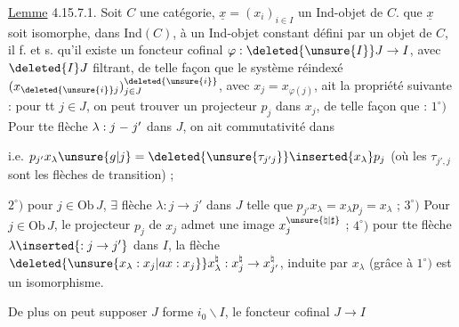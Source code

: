 \uline{Lemme} 4.15.7.1. Soit $C$ une catégorie, $\underline{x}=(x_i)_{i\in I}$ un Ind-objet de $C$.  que  $\underline{x}$ soit  isomorphe, dans $\mathrm{Ind}(C)$, à un  Ind-objet constant  défini par un objet 
%
%
de $C$, il f. et s. qu'il existe un foncteur cofinal $\varphi:\deleted{\unsure{I}}J\to I$, avec $\deleted{I}J$ filtrant, de telle façon que le système réindexé $(x_{\deleted{\unsure{i}}j})^{\deleted{\unsure{i}}}_{j\in J}$, avec $x_j=x_{\varphi(j)}$, ait la propriété suivante : pour tt $j\in J$, on peut trouver un projecteur $p_j$ dans $x_j$, de telle façon que : $1^\circ)$ Pour tte flèche $\lambda:j\mathrel{\relbar}j'$ dans $J$, on ait commutativité dans


i.e. $p_{j'}x_\lambda \unsure{g|j}=\deleted{\unsure{\tau_{j'j}}}\inserted{x_\lambda}p_j$ (où les $\tau_{j',j}$ sont les flèches de transition) ; 

$2^\circ)$ pour  $j\in\mathrm{Ob}\,J$, $\exists$ flèche $\lambda:j\longrightarrow j'$ dans $J$ telle que $p_{j'}x_\lambda=x_\lambda p_j=x_\lambda$ ; $3^\circ)$ Pour  $j\in\mathrm{Ob}\,J$, le projecteur $p_j$ de $x_j$ admet une image $x_j^{\unsure{\natural|\sharp}}$ ; $4^\circ)$  pour tte flèche $\lambda\inserted{:j\to j'}$ dans $I$, la flèche $\deleted{\unsure{x_\lambda:x_j|ax:x_j}}x_\lambda^\natural:x_j^\natural\to x_{j'}^\natural$, induite par $x_\lambda$ (grâce à $1^\circ)$ est un isomorphisme.

De plus  on peut supposer $J$  forme $i_0\backslash I$, le foncteur cofinal $J\to I$


